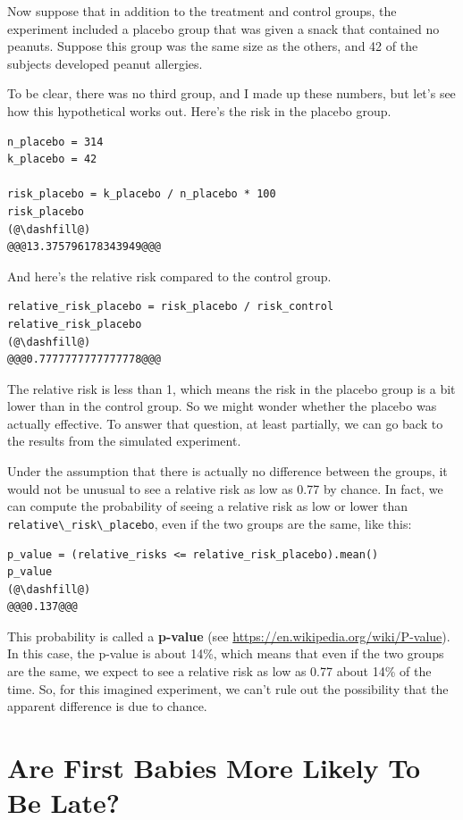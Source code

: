 Now suppose that in addition to the treatment and control groups, the
experiment included a placebo group that was given a snack that
contained no peanuts. Suppose this group was the same size as the
others, and 42 of the subjects developed peanut allergies.

To be clear, there was no third group, and I made up these numbers, but
let's see how this hypothetical works out. Here's the risk in the
placebo group.

\begin{lstlisting}[]
n_placebo = 314
k_placebo = 42

risk_placebo = k_placebo / n_placebo * 100
risk_placebo
(@\dashfill@)
@@@13.375796178343949@@@
\end{lstlisting}

And here's the relative risk compared to the control group.

\begin{lstlisting}[]
relative_risk_placebo = risk_placebo / risk_control
relative_risk_placebo
(@\dashfill@)
@@@0.7777777777777778@@@
\end{lstlisting}

The relative risk is less than 1, which means the risk in the placebo
group is a bit lower than in the control group. So we might wonder
whether the placebo was actually effective. To answer that question, at
least partially, we can go back to the results from the simulated
experiment.

Under the assumption that there is actually no difference between the
groups, it would not be unusual to see a relative risk as low as 0.77 by
chance. In fact, we can compute the probability of seeing a relative
risk as low or lower than
\passthrough{\lstinline!relative\_risk\_placebo!}, even if the two
groups are the same, like this:

\begin{lstlisting}[]
p_value = (relative_risks <= relative_risk_placebo).mean()
p_value
(@\dashfill@)
@@@0.137@@@
\end{lstlisting}

This probability is called a \textbf{p-value} (see
\url{https://en.wikipedia.org/wiki/P-value}). In this case, the p-value
is about 14\%, which means that even if the two groups are the same, we
expect to see a relative risk as low as 0.77 about 14\% of the time. So,
for this imagined experiment, we can't rule out the possibility that the
apparent difference is due to chance.

\hypertarget{are-first-babies-more-likely-to-be-late}{%
\section{Are First Babies More Likely To Be
Late?}\label{are-first-babies-more-likely-to-be-late}}

